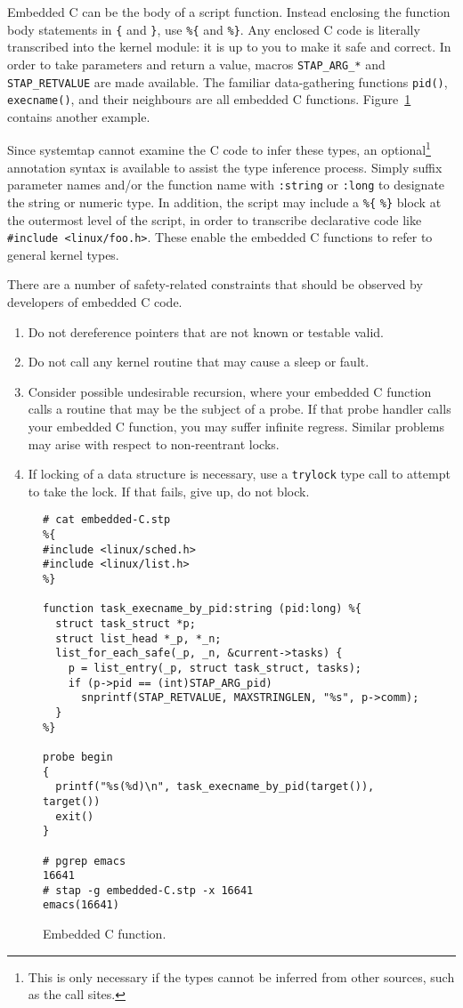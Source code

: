 \documentclass{article}
\newenvironment{boxedminipage}%
    {\begin{makeimage}\begin{center}\begin{Sbox}\begin{minipage}}%
    {\end{minipage}\end{Sbox}\fbox{\TheSbox}\end{center}\end{makeimage}}
\begin{document}
Embedded C can be the body of a script function.  Instead enclosing
the function body statements in \verb+{+ and \verb+}+, use \verb+%{+
and \verb+%}+.  Any enclosed C code is literally transcribed into the
kernel module: it is up to you to make it safe and correct.  In order
to take parameters and return a value, macros \verb+STAP_ARG_*+ and
\verb+STAP_RETVALUE+ are made available.  The familiar data-gathering
functions \verb+pid()+, \verb+execname()+, and their neighbours are
all embedded C functions.  Figure~\ref{fig:embedded-C} contains
another example.

Since systemtap cannot examine the C code to infer these types, an
optional\footnote{This is only necessary if the types cannot be
inferred from other sources, such as the call sites.} annotation
syntax is available to assist the type inference process.  Simply
suffix parameter names and/or the function name with \verb+:string+ or
\verb+:long+ to designate the string or numeric type.  In addition,
the script may include a \verb+%{+ \verb+%}+ block at the outermost
level of the script, in order to transcribe declarative code like
\verb+#include <linux/foo.h>+.  These enable the embedded C functions
to refer to general kernel types.

There are a number of safety-related constraints that should be
observed by developers of embedded C code.
\begin{enumerate}
\item Do not dereference pointers that are not known or testable valid.
\item Do not call any kernel routine that may cause a sleep or fault.
\item Consider possible undesirable recursion, where your embedded C
function calls a routine that may be the subject of a probe.  If that
probe handler calls your embedded C function, you may suffer infinite
regress.  Similar problems may arise with respect to non-reentrant
locks.
\item If locking of a data structure is necessary, use a
\verb+trylock+ type call to attempt to take the lock.  If that fails,
give up, do not block.
\end{enumerate}

\begin{figure}[!ht]
\begin{boxedminipage}{4.5in}
\begin{verbatim}
# cat embedded-C.stp
%{
#include <linux/sched.h>
#include <linux/list.h>
%}

function task_execname_by_pid:string (pid:long) %{
  struct task_struct *p;
  struct list_head *_p, *_n;
  list_for_each_safe(_p, _n, &current->tasks) {
    p = list_entry(_p, struct task_struct, tasks);
    if (p->pid == (int)STAP_ARG_pid) 
      snprintf(STAP_RETVALUE, MAXSTRINGLEN, "%s", p->comm);
  }
%}

probe begin
{
  printf("%s(%d)\n", task_execname_by_pid(target()), target())
  exit()
}

# pgrep emacs
16641
# stap -g embedded-C.stp -x 16641
emacs(16641)
\end{verbatim}
\end{boxedminipage}
\caption{Embedded C function.}
\label{fig:embedded-C}
\end{figure}
\end{document}
